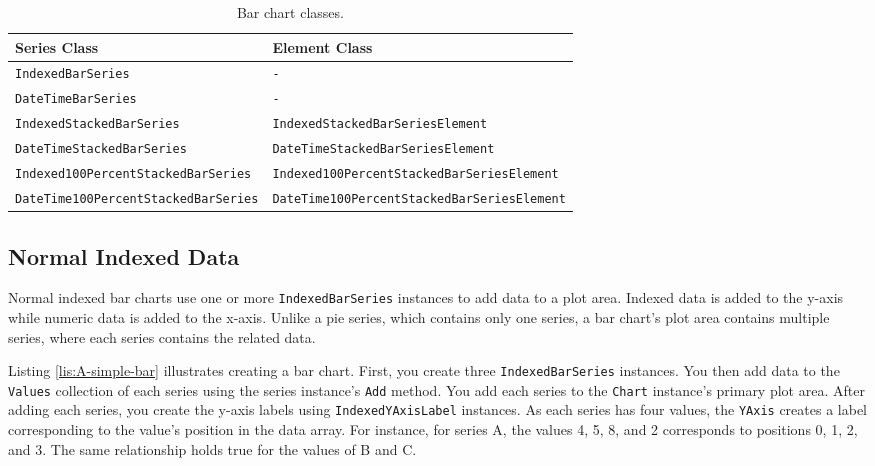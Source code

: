 \documentclass[american,letterpaper]{tufte-book}
\providecommand{\tabularnewline}{\\}
\numberwithin{equation}{section}
\numberwithin{figure}{section}
\begin{document}
{\begin{table}
\raggedright
\begin{tabular}{p{}p{}}
\toprule 
{\scriptsize Series Class} & {\scriptsize Element Class}\tabularnewline
\midrule
{\scriptsize\texttt{IndexedBarSeries}} & {\scriptsize\texttt{-}}\tabularnewline
{\scriptsize\texttt{DateTimeBarSeries}} & {\scriptsize\texttt{-}}\tabularnewline
{\scriptsize\texttt{IndexedStackedBarSeries}} & {\scriptsize\texttt{IndexedStackedBarSeriesElement}}\tabularnewline
{\scriptsize\texttt{DateTimeStackedBarSeries}} & {\scriptsize\texttt{DateTimeStackedBarSeriesElement}}\tabularnewline
{\scriptsize\texttt{Indexed100PercentStackedBarSeries}} & {\scriptsize\texttt{Indexed100PercentStackedBarSeriesElement}}\tabularnewline
{\scriptsize\texttt{DateTime100PercentStackedBarSeries}} & {\scriptsize\texttt{DateTime100PercentStackedBarSeriesElement}}\tabularnewline
\bottomrule
\end{tabular}\caption{Bar chart classes.}\label{tab:bar-chart-Core-Suite-classes-1}
\end{table}


\subsection{Normal Indexed Data}

Normal indexed bar charts use one or more \texttt{IndexedBarSeries}
instances to add data to a plot area. Indexed data is added to the
y-axis while numeric data is added to the x-axis. Unlike a pie series,
which contains only one series, a bar chart's plot area contains multiple
series, where each series contains the related data. 

Listing \ref{lis:A-simple-bar} illustrates creating a bar chart.
First, you create three \texttt{IndexedBarSeries} instances. You then
add data to the \texttt{Values} collection of each series using the
series instance's \texttt{Add} method. You add each series to the \texttt{Chart}
instance's primary plot area. After adding each series, you create
the y-axis labels using \texttt{IndexedYAxisLabel} instances. As each
series has four values, the \texttt{YAxis} creates a label corresponding
to the value's position in the data array. For instance, for series
A, the values 4, 5, 8, and 2 corresponds to positions 0, 1, 2, and
3. The same relationship holds true for the values of B and C.

}
\end{document}
